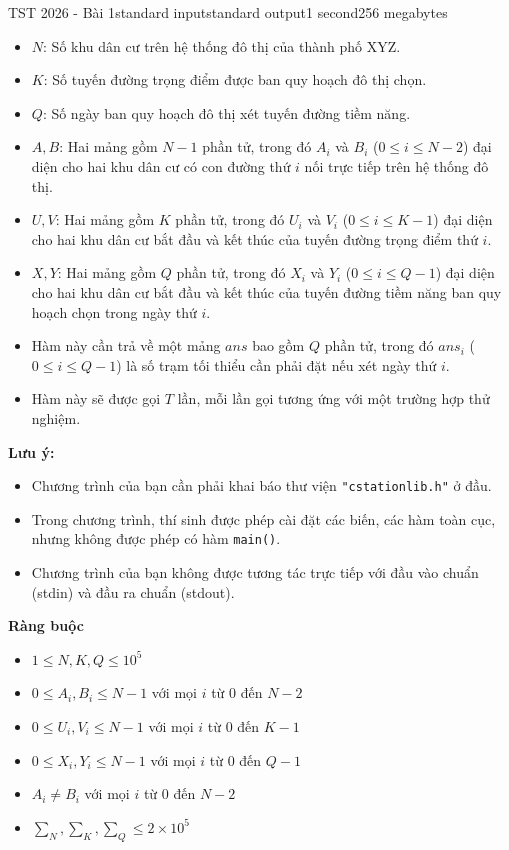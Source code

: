 \begin{problem}{TST 2026 - Bài 1}{standard input}{standard output}{1 second}{256 megabytes}
\begin{itemize}
   \item $N$: Số khu dân cư trên hệ thống đô thị của thành phố XYZ.
   \item $K$: Số tuyến đường trọng điểm được ban quy hoạch đô thị chọn.
   \item $Q$: Số ngày ban quy hoạch đô thị xét tuyến đường tiềm năng.
   \item $A,B$: Hai mảng gồm $N-1$ phần tử, trong đó $A_i$ và $B_i$ ($0\le i\le N-2$) đại diện cho hai khu dân cư có con đường thứ $i$ nối trực tiếp trên hệ thống đô thị.
   \item $U,V$: Hai mảng gồm $K$ phần tử, trong đó $U_i$ và $V_i$ ($0\le i\le K-1$) đại diện cho hai khu dân cư bắt đầu và kết thúc của tuyến đường trọng điểm thứ $i$.
   \item $X,Y$: Hai mảng gồm $Q$ phần tử, trong đó $X_i$ và $Y_i$ ($0\le i\le Q-1$) đại diện cho hai khu dân cư bắt đầu và kết thúc của tuyến đường tiềm năng ban quy hoạch chọn trong ngày thứ $i$.
   \item Hàm này cần trả về một mảng $ans$ bao gồm $Q$ phần tử, trong đó $ans_i$ ($0\le i\le Q-1$) là số trạm tối thiểu cần phải đặt nếu xét ngày thứ $i$.
   \item Hàm này sẽ được gọi $T$ lần, mỗi lần gọi tương ứng với một trường hợp thử nghiệm.
\end{itemize}

\textbf{Lưu ý:}
\begin{itemize}
   \item Chương trình của bạn cần phải khai báo thư viện \texttt{"cstationlib.h"} ở đầu.
   \item Trong chương trình, thí sinh được phép cài đặt các biến, các hàm toàn cục, nhưng không được phép có hàm \texttt{main()}.
   \item Chương trình của bạn không được tương tác trực tiếp với đầu vào chuẩn (stdin) và đầu ra chuẩn (stdout).
\end{itemize}

\textbf{Ràng buộc}

\begin{itemize}
   \item $1\le N,K,Q\le 10^5$
   \item $0\le A_i,B_i\le N-1$ với mọi $i$ từ $0$ đến $N-2$
   \item $0\le U_i,V_i\le N-1$ với mọi $i$ từ $0$ đến $K-1$
   \item $0\le X_i,Y_i\le N-1$ với mọi $i$ từ $0$ đến $Q-1$
   \item $A_i\ne B_i$ với mọi $i$ từ $0$ đến $N-2$
   \item $\sum_N,\sum_K,\sum_Q\le 2\times 10^5$
\end{itemize}


\end{problem}
